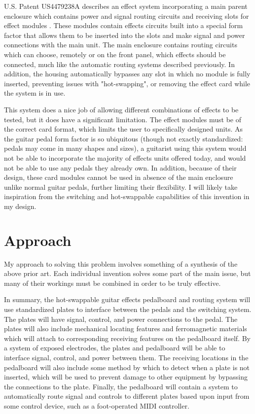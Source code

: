 \documentclass{article}
\begin{document}
U.S. Patent US4479238A describes an effect system incorporating a main parent enclosure which contains power and signal routing circuits and receiving slots for effect modules \cite{SPECTOR:1982}.  These modules contain effects circuits built into a special form factor that allows them to be inserted into the slots and make signal and power connections with the main unit.  The main enclosure contains routing circuits which can choose, remotely or on the front panel, which effects should be connected, much like the automatic routing systems described previously.  In addition, the housing automatically bypasses any slot in which no module is fully inserted, preventing issues with "hot-swapping", or removing the effect card while the system is in use.

This system does a nice job of allowing different combinations of effects to be tested, but it does have a significant limitation.  The effect modules must be of the correct card format, which limits the user to specifically designed units.  As the guitar pedal form factor is so ubiquitous (though not exactly standardized: pedals may come in many shapes and sizes), a guitarist using this system would not be able to incorporate the majority of effects units offered today, and would not be able to use any pedals they already own.  In addition, because of their design, these card modules cannot be used in absence of the main enclosure unlike normal guitar pedals, further limiting their flexibility.  I will likely take inspiration from the switching and hot-swappable capabilities of this invention in my design. 

\section{Approach} \label{Approach}

My approach to solving this problem involves something of a synthesis of the above prior art.  Each individual invention solves some part of the main issue, but many of their workings must be combined in order to be truly effective.

In summary, the hot-swappable guitar effects pedalboard and routing system will use standardized plates to interface between the pedals and the switching system.  The plates will have signal, control, and power connections to the pedal.  The plates will also include mechanical locating features and ferromagnetic materials which will attach to corresponding receiving features on the pedalboard itself.  By a system of exposed electrodes, the plates and pedalboard will be able to interface signal, control, and power between them.  The receiving locations in the pedalboard will also include some method by which to detect when a plate is not inserted, which will be used to prevent damage to other equipment by bypassing the connections to the plate.  Finally, the pedalboard will contain a system to automatically route signal and controls to different plates based upon input from some control device, such as a foot-operated MIDI controller.
\end{document}

